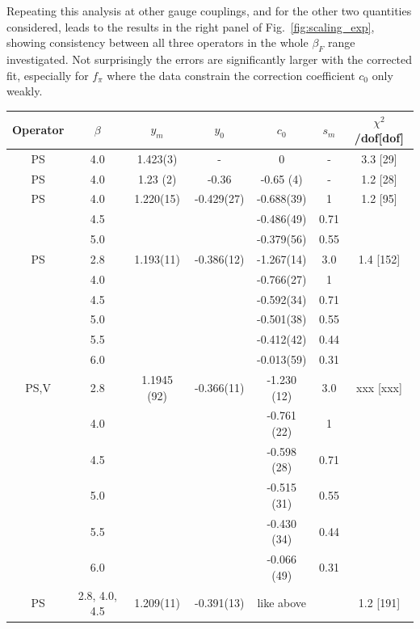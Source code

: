 \documentclass[aps,prl,twocolumn,]{revtex4}  %
\newcommand{\fig}[1]{Fig.~\ref{#1}}
\begin{document}
Repeating this analysis at other gauge couplings, and for the other two quantities considered, leads to the results in the right panel of \fig{fig:scaling_exp}, showing consistency between all three operators in the whole $\beta_F$ range investigated.
Not surprisingly the errors are significantly larger with the corrected fit, especially for $f_\pi$ where the data constrain the correction coefficient $c_0$ only weakly.
\begin{table}[htdp]
\begin{center}
\begin{tabular}{|c|c|c|c|c|c|c|}
\hline
Operator & $\beta$ & $y_m$ & $y_0$ & $c_0$ &  $ s_m $  & $\chi^2$/dof[dof]   \\
\hline\hline
PS	&	4.0	& 	1.423(3)	&	 - 		    &	0	        &	-	    	&	3.3 [29]	\\
\hline
PS	&	4.0	&	1.23 (2)	&	-0.36	    &	-0.65 (4)	&	-	    	&	1.2 [28] \\
\hline
PS	&	4.0	& 	1.220(15)	&	 -0.429(27) &	-0.688(39)	&	1	    &   1.2 [95] \\
	&	4.5	&		        &			    &	-0.486(49)	&	0.71   &	 	        \\
	&	5.0	&	        	&       		&	-0.379(56)	&	0.55	&		        \\
\hline
PS	&	2.8	& 	1.193(11)	&	 -0.386(12) &	-1.267(14)	&	3.0	    &	1.4 [152] \\
	&	4.0	& 	        	&	        	&	-0.766(27)	&	1	    &		    \\
	&	4.5	&		        &		        &	-0.592(34)	&	0.71	&	        \\
	&	5.0	&		        &		        &	-0.501(38)	&	0.55	&	        \\
	&	5.5	&		        &		        &   -0.412(42)	&	0.44	&	        \\
	&	6.0	&		        &		        &	-0.013(59)	&	0.31	&	        \\
\hline
PS,V	&	2.8	& 	1.1945 (92)	&	 -0.366(11) &	-1.230 (12)	&	3.0	    &	xxx [xxx] \\
	&	4.0	& 	        	&	        	&	-0.761 (22)	&	1	    &		    \\
	&	4.5	&		        &		        &	-0.598 (28)	&	0.71	&	        \\
	&	5.0	&		        &		        &	-0.515 (31)	&	0.55	&	        \\
	&	5.5	&		        &		        &   -0.430 (34)	&	0.44	&	        \\
	&	6.0	&		        &		        &	-0.066 (49)	&	0.31	&	        \\
\hline
PS	&	2.8, 4.0, 4.5	& 	1.209(11)	&	 -0.391(13)	&	like above	&		    &	1.2 [191] \\

\end{tabular}
\end{center}
\end{table}
\end{document}
